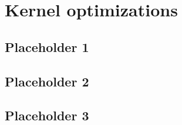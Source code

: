 
\chapter{Kernel optimizations}

\section{Placeholder 1}

\section{Placeholder 2}

\section{Placeholder 3}

